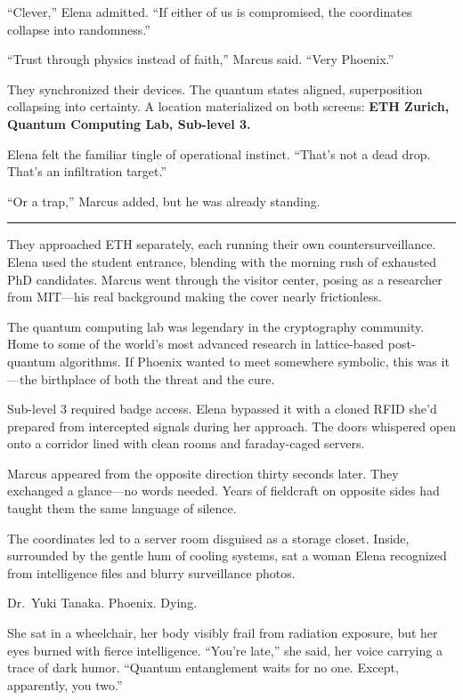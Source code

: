 ``Clever,'' Elena admitted. ``If either of us is compromised, the coordinates collapse into randomness.''

``Trust through physics instead of faith,'' Marcus said. ``Very Phoenix.''

They synchronized their devices. The quantum states aligned, superposition collapsing into certainty. A location materialized on both screens: \textbf{ETH Zurich, Quantum Computing Lab, Sub-level 3.}

Elena felt the familiar tingle of operational instinct. ``That's not a dead drop. That's an infiltration target.''

``Or a trap,'' Marcus added, but he was already standing.

\begin{center}\rule{0.5\linewidth}{0.5pt}\end{center}

They approached ETH separately, each running their own countersurveillance. Elena used the student entrance, blending with the morning rush of exhausted PhD candidates. Marcus went through the visitor center, posing as a researcher from MIT---his real background making the cover nearly frictionless.

The quantum computing lab was legendary in the cryptography community. Home to some of the world's most advanced research in lattice-based post-quantum algorithms. If Phoenix wanted to meet somewhere symbolic, this was it---the birthplace of both the threat and the cure.

Sub-level 3 required badge access. Elena bypassed it with a cloned RFID she'd prepared from intercepted signals during her approach. The doors whispered open onto a corridor lined with clean rooms and faraday-caged servers.

Marcus appeared from the opposite direction thirty seconds later. They exchanged a glance---no words needed. Years of fieldcraft on opposite sides had taught them the same language of silence.

The coordinates led to a server room disguised as a storage closet. Inside, surrounded by the gentle hum of cooling systems, sat a woman Elena recognized from intelligence files and blurry surveillance photos.

Dr.~Yuki Tanaka. Phoenix. Dying.

She sat in a wheelchair, her body visibly frail from radiation exposure, but her eyes burned with fierce intelligence. ``You're late,'' she said, her voice carrying a trace of dark humor. ``Quantum entanglement waits for no one. Except, apparently, you two.''

